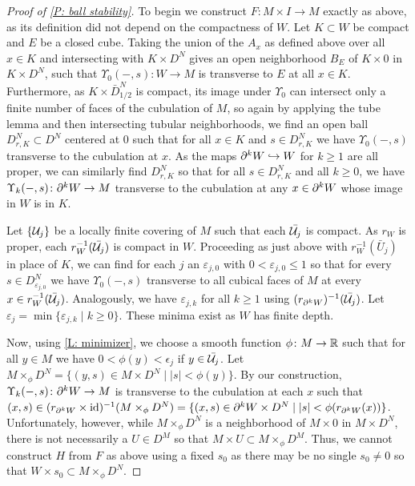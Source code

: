 \begin{proof}[Proof of \cref{P: ball stability}]
	To begin we construct $F \colon M \times I \to M$ exactly as above, as its definition did not depend on the compactness of $W$.
	Let $K \subset W$ be compact and $E$ be a closed cube.
	Taking the union of the $A_x$ as defined above over all $x \in K$ and intersecting with $K \times D^N$ gives an open neighborhood $B_E$ of $K \times 0$ in $K \times D^N$, such that
	$\Upsilon_0(-,s) \colon W \to M$ is transverse to $E$ at all $x \in K$.
	Furthermore, as $K \times \bar D^N_{1/2}$ is compact, its image under $\Upsilon_0$ can intersect only a finite number of faces of the cubulation of $M$, so again by applying the tube lemma and then intersecting tubular neighborhoods, we find an open ball $D_{r,K}^N \subset D^N$ centered at $0$ such that for all $x \in K$ and $s \in D_{r,K}^N$ we have $\Upsilon_0(-,s)$ transverse to the cubulation at $x$.
	As the maps $\partial^kW \hookrightarrow W$ for $k\geq 1$ are all proper, we can similarly find $D_{r,K}^N$ so that for all $s \in D_{r,K}^N$ and all $k\geq 0$, we have $\Upsilon_k(-,s) \colon \partial^kW \to M$ transverse to the cubulation at any $x \in \partial^{k}W$ whose image in $W$ is in $K$.

	Let $\{\mathcal{U}_j\}$ be a locally finite covering of $M$ such that each $\bar{\mathcal{U}_j}$ is compact.
	As $r_W$ is proper, each $r^{-1}_W(\bar {\mathcal{U}_j})$ is compact in $W$.
	Proceeding as just above with $r_W^{-1}(\bar U_j)$ in place of $K$, we can find for each $j$ an $\varepsilon_{j,0}$ with $0 < \varepsilon_{j,0} \leq 1$ so that for every $s \in D^N_{\varepsilon_{j,0}}$ we have $\Upsilon_0(-,s)$ transverse to all cubical faces of $M$ at every $x \in r^{-1}_W(\bar {\mathcal{U}_j})$.
	Analogously, we have $\varepsilon_{j,k}$ for all $k\geq 1$ using $(r_{\partial^k W})^{-1}(\bar {\mathcal{U}_j})$.
	Let $\varepsilon_j = \min\{\varepsilon_{j,k} \mid k\geq 0\}$.
	These minima exist as $W$ has finite depth.

	Now, using \cref{L: minimizer}, we choose a smooth function $\phi \colon M \to \mathbb{R}$ such that for all $y \in M$ we have $0<\phi(y)<\epsilon_j$ if $y \in \bar{\mathcal{U}_j}$.
	Let $M\times_\phi D^N = \{(y,s) \in M \times D^N \mid |s|<\phi(y)\}$.
	By our construction, $\Upsilon_k(-,s) \colon \partial^{k}W \to M$ is transverse to the cubulation at each $x$ such that $(x,s)\in(r_{\partial^{k}W} \times \mathrm{id})^{-1}(M\times_\phi D^N) = \{(x,s) \in \partial^{k}W \times D^N \mid |s|<\phi(r_{\partial^kW}(x))\}$.
	Unfortunately, however, while $M\times_\phi D^N$ is a neighborhood of $M \times 0$ in $M \times D^N$, there is not necessarily a $U \in D^M$ so that $M \times U \subset M\times_\phi D^M$.
	Thus,
	we cannot construct $H$ from $F$ as above using a fixed $s_0$ as there may be no single $s_0\neq 0$ so that $W \times s_0 \subset M\times_\phi D^N$.


\end{proof}
